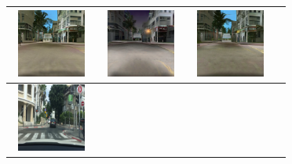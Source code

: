 \documentclass{VUMIFPSbakalaurinis}
\begin{document}
\begin{table}[H]
{\begin{tabular}{|c|c|c|c|}
            \includegraphics[width=100,height=85]{img/pvz/4_cycle_v2} & \includegraphics[width=100,height=85]{img/pvz/4_cut_v2} & \includegraphics[width=100,height=85]{img/pvz/4_mspc_v2}
            \\
            \hline
            \includegraphics[width=100,height=85]{img/pvz/5_real} & 

\end{tabular}}
\end{table}
\end{document}
